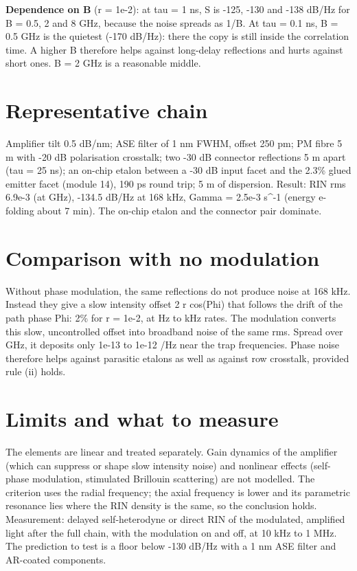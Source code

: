 \textbf{Dependence on B} (r = 1e-2): at tau = 1 ns, S is -125, -130 and
-138 dB/Hz for B = 0.5, 2 and 8 GHz, because the noise spreads as 1/B.
At tau = 0.1 ns, B = 0.5 GHz is the quietest (-170 dB/Hz): there the
copy is still inside the correlation time. A higher B therefore helps
against long-delay reflections and hurts against short ones. B = 2 GHz
is a reasonable middle.

\hypertarget{3-representative-chain}{%
\section{Representative chain}\label{pm_am-3-representative-chain}}

Amplifier tilt 0.5 dB/nm; ASE filter of 1 nm FWHM, offset 250 pm; PM
fibre 5 m with -20 dB polarisation crosstalk; two -30 dB connector
reflections 5 m apart (tau = 25 ns); an on-chip etalon between a -30 dB
input facet and the 2.3\% glued emitter facet (module 14), 190 ps round
trip; 5 m of dispersion. Result: RIN rms 6.9e-3 (at GHz), -134.5 dB/Hz
at 168 kHz, Gamma = 2.5e-3 s\^{}-1 (energy e-folding about 7 min). The
on-chip etalon and the connector pair dominate.

\hypertarget{4-comparison-with-no-modulation}{%
\section{Comparison with no
modulation}\label{pm_am-4-comparison-with-no-modulation}}

Without phase modulation, the same reflections do not produce noise at
168 kHz. Instead they give a slow intensity offset 2 r cos(Phi) that
follows the drift of the path phase Phi: 2\% for r = 1e-2, at Hz to kHz
rates. The modulation converts this slow, uncontrolled offset into
broadband noise of the same rms. Spread over GHz, it deposits only 1e-13
to 1e-12 /Hz near the trap frequencies. Phase noise therefore helps
against parasitic etalons as well as against row crosstalk, provided
rule (ii) holds.

\hypertarget{5-limits-and-what-to-measure}{%
\section{Limits and what to
measure}\label{pm_am-5-limits-and-what-to-measure}}

The elements are linear and treated separately. Gain dynamics of the
amplifier (which can suppress or shape slow intensity noise) and
nonlinear effects (self-phase modulation, stimulated Brillouin
scattering) are not modelled. The criterion uses the radial frequency;
the axial frequency is lower and its parametric resonance lies where the
RIN density is the same, so the conclusion holds. Measurement: delayed
self-heterodyne or direct RIN of the modulated, amplified light after
the full chain, with the modulation on and off, at 10 kHz to 1 MHz. The
prediction to test is a floor below -130 dB/Hz with a 1 nm ASE filter
and AR-coated components.

